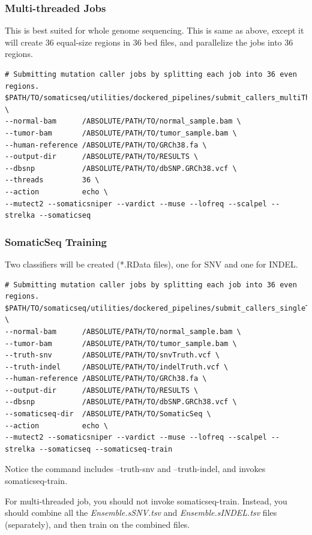 \documentclass[10pt,letterpaper]{article}
\begin{document}
\begin{sloppypar}
\subsubsection{Multi-threaded Jobs}

This is best suited for whole genome sequencing. 
This is same as above, except it will create 36 equal-size regions in 36 bed files, and parallelize the jobs into 36 regions.

\begin{lstlisting}
# Submitting mutation caller jobs by splitting each job into 36 even regions.
$PATH/TO/somaticseq/utilities/dockered_pipelines/submit_callers_multiThreads.sh \
--normal-bam      /ABSOLUTE/PATH/TO/normal_sample.bam \
--tumor-bam       /ABSOLUTE/PATH/TO/tumor_sample.bam \
--human-reference /ABSOLUTE/PATH/TO/GRCh38.fa \
--output-dir      /ABSOLUTE/PATH/TO/RESULTS \
--dbsnp           /ABSOLUTE/PATH/TO/dbSNP.GRCh38.vcf \
--threads         36 \
--action          echo \
--mutect2 --somaticsniper --vardict --muse --lofreq --scalpel --strelka --somaticseq
\end{lstlisting}



\subsubsection{SomaticSeq Training}

Two classifiers will be created (*.RData files), one for SNV and one for INDEL.

\begin{lstlisting}
# Submitting mutation caller jobs by splitting each job into 36 even regions.
$PATH/TO/somaticseq/utilities/dockered_pipelines/submit_callers_singleThread.sh \
--normal-bam      /ABSOLUTE/PATH/TO/normal_sample.bam \
--tumor-bam       /ABSOLUTE/PATH/TO/tumor_sample.bam \
--truth-snv       /ABSOLUTE/PATH/TO/snvTruth.vcf \
--truth-indel     /ABSOLUTE/PATH/TO/indelTruth.vcf \
--human-reference /ABSOLUTE/PATH/TO/GRCh38.fa \
--output-dir      /ABSOLUTE/PATH/TO/RESULTS \
--dbsnp           /ABSOLUTE/PATH/TO/dbSNP.GRCh38.vcf \
--somaticseq-dir  /ABSOLUTE/PATH/TO/SomaticSeq \
--action          echo \
--mutect2 --somaticsniper --vardict --muse --lofreq --scalpel --strelka --somaticseq --somaticseq-train
\end{lstlisting}

Notice the command includes --truth-snv and --truth-indel, and invokes somaticseq-train.

For multi-threaded job, you should not invoke somaticseq-train. Instead, you should combine all the \textit{Ensemble.sSNV.tsv} and \textit{Ensemble.sINDEL.tsv} files (separately), and then train on the combined files.





\end{sloppypar}
\end{document}
